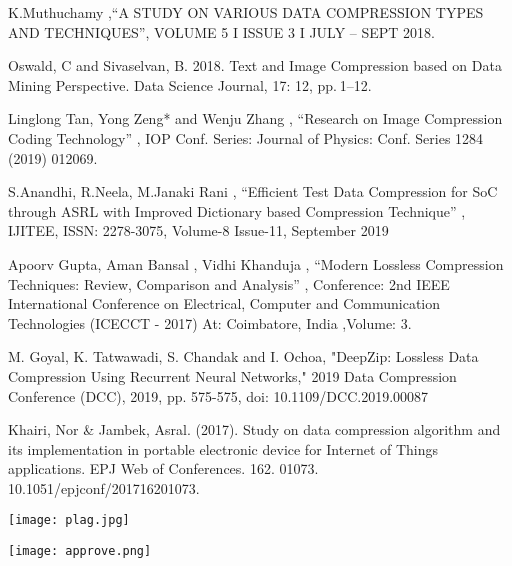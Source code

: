 \documentclass[a4paper, 12pt]{article}
\begin{document}
\begin{thebibliography}{21}
 K.Muthuchamy ,“A STUDY ON VARIOUS DATA COMPRESSION TYPES AND TECHNIQUES”, VOLUME 5 I ISSUE 3 I JULY – SEPT 2018.

 Oswald, C and Sivaselvan, B. 2018. Text and Image Compression based on Data Mining Perspective. Data Science Journal, 17: 12, pp. 1–12.

 Linglong Tan, Yong Zeng* and Wenju Zhang , “Research on Image Compression Coding Technology” , IOP Conf. Series: Journal of Physics: Conf. Series 1284 (2019) 012069.


 S.Anandhi, R.Neela, M.Janaki Rani , “Efficient Test Data Compression for SoC through ASRL with Improved Dictionary based Compression Technique” , IJITEE, ISSN: 2278-3075, Volume-8 Issue-11, September 2019


 Apoorv Gupta, Aman Bansal , Vidhi Khanduja , “Modern Lossless Compression Techniques: Review, Comparison and Analysis” , Conference: 2nd IEEE International Conference on Electrical, Computer and Communication Technologies (ICECCT - 2017) At: Coimbatore, India ,Volume: 3.



M. Goyal, K. Tatwawadi, S. Chandak and I. Ochoa, "DeepZip: Lossless Data Compression Using Recurrent Neural Networks," 2019 Data Compression Conference (DCC), 2019, pp. 575-575, doi: 10.1109/DCC.2019.00087



 Khairi, Nor & Jambek, Asral. (2017). Study on data compression algorithm and its implementation in portable electronic device for Internet of Things applications. EPJ Web of Conferences. 162. 01073. 10.1051/epjconf/201716201073.


\end{thebibliography}


\newpage
\texttt{[image: plag.jpg]}
\vspace{5mm}

\newpage
\texttt{[image: approve.png]}
\vspace{5mm}
\end{document}
